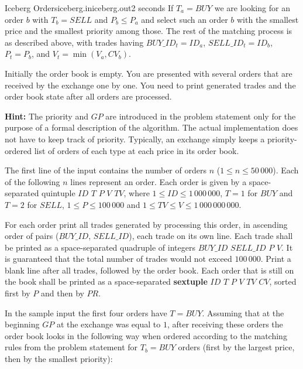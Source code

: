 \begin{problem}{Iceberg Orders}{iceberg.in}{iceberg.out}{2 seconds}
If $T_a = BUY$ we are looking for an order $b$ with $T_b = SELL$ and $P_b \leq P_a$ and select such an order $b$ 
with the smallest price and the smallest priority among those. The rest of the matching process is as described above,
with trades having $BUY\_ID_t = ID_a$, $SELL\_ID_t = ID_b$, $P_t = P_b$, and $V_t = \min(V_a, CV_b)$.

Initially the order book is empty. You are presented with several orders that are received by the exchange one by one. You need
to print generated trades and the order book state after all orders are processed.

\textbf{Hint:} The priority and $GP$ are introduced in the problem statement only for the purpose of a formal description of the algorithm. 
The actual implementation does not have to keep track of priority. Typically, an exchange simply keeps a priority-ordered list of
orders of each type at each price in its order book.

\InputFile

The first line of the input contains the number of orders $n$ ($1 \leq n \leq 50\,000$). Each of the following $n$ lines represent an order.
Each order is given by a space-separated quintuple $ID$ $T$ $P$ $V$ $TV$, 
where $1 \leq ID \leq 1\,000\,000$, $T = 1$ for $BUY$ and $T = 2$ for $SELL$,
$1 \leq P \leq 100\,000$ and $1 \leq TV \leq V \leq 1\,000\,000\,000$.

\OutputFile

For each order print all trades generated by processing this order, in ascending order of pairs ($BUY\_ID$, $SELL\_ID$),
each trade on its own line.
Each trade shall be printed as a space-separated quadruple of integers
$BUY\_ID$ $SELL\_ID$ $P$ $V$. It is guaranteed that the total number of trades would not exceed $100\,000$.
Print a blank line after all trades, followed by the order book. Each order that is still on the book shall be printed 
as a space-separated \textbf{sextuple} $ID$ $T$ $P$ $V$ $TV$ $CV$, sorted first by $P$ and then by $PR$.

\Example

\begin{example}
%
\end{example}

In the sample input the first four orders have $T = BUY$. Assuming that at the beginning $GP$ at the exchange was equal to $1$, 
after receiving these orders the order book looks in the following way when ordered according to the matching rules from the problem
statement for $T_b=BUY$ orders (first by the largest price, then by the smallest priority): 


\end{problem}

